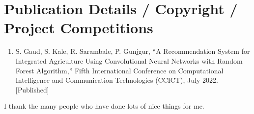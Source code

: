 \documentclass{RAITreport}
\begin{document}
\chapter{Publication Details / Copyright / Project Competitions}
\begin{enumerate}
	\item  S. Gaud, S. Kale, R. Sarambale, P. Gunjgur, “A Recommendation System for Integrated Agriculture Using Convolutional Neural Networks with Random Forest Algorithm,” Fifth International Conference on Computational Intelligence and Communication Technologies (CCICT), July 2022. [Published]
\end{enumerate}


\begin{acknowledgments}\thispagestyle{plain}
I thank the many people who have done lots of nice things for me.
\end{acknowledgments}
\end{document}
